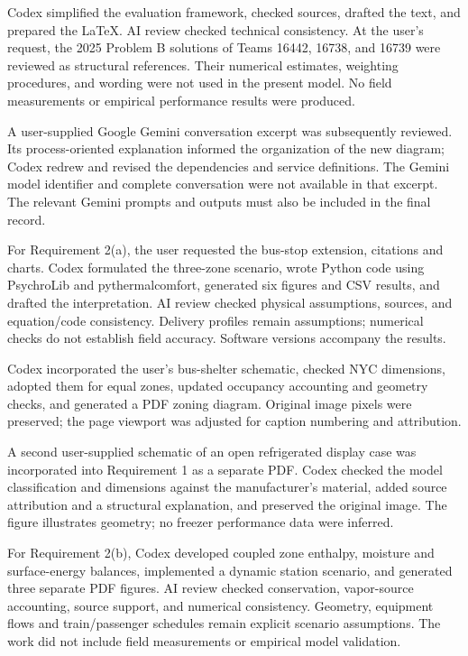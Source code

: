 \documentclass[12pt]{article}
\begin{document}
Codex simplified the evaluation framework, checked sources, drafted the text,
and prepared the LaTeX. AI review checked technical consistency. At the user's request,
the 2025 Problem B solutions of Teams 16442, 16738, and 16739 were reviewed as
structural references. Their numerical estimates, weighting procedures, and
wording were not used in the present model. No field measurements or empirical
performance results were produced.

A user-supplied Google Gemini conversation excerpt was subsequently reviewed.
Its process-oriented explanation informed the organization of the new diagram;
Codex redrew and revised the dependencies and service definitions. The Gemini
model identifier and complete conversation were not available in that excerpt.
The relevant Gemini prompts and outputs must also be included in the final record.

For Requirement 2(a), the user requested the bus-stop extension, citations and
charts. Codex formulated the three-zone scenario, wrote Python code using
PsychroLib and pythermalcomfort, generated six figures and CSV results, and
drafted the interpretation. AI review checked physical assumptions, sources,
and equation/code consistency. Delivery profiles remain assumptions; numerical
checks do not establish field accuracy. Software versions accompany the results.

Codex incorporated the user's bus-shelter schematic, checked NYC dimensions,
adopted them for equal zones, updated occupancy accounting and geometry checks,
and generated a PDF zoning diagram. Original image pixels were preserved; the
page viewport was adjusted for caption numbering and attribution.

A second user-supplied schematic of an open refrigerated display case was
incorporated into Requirement 1 as a separate PDF. Codex checked the model
classification and dimensions against the manufacturer's material, added source
attribution and a structural explanation, and preserved the original image.
The figure illustrates geometry; no freezer performance data were inferred.

For Requirement 2(b), Codex developed coupled zone enthalpy, moisture and
surface-energy balances, implemented a dynamic station scenario, and generated
three separate PDF figures. AI review checked conservation, vapor-source
accounting, source support, and numerical consistency. Geometry, equipment
flows and train/passenger schedules remain explicit scenario assumptions.
The work did not include field measurements or empirical model validation.
\end{document}
